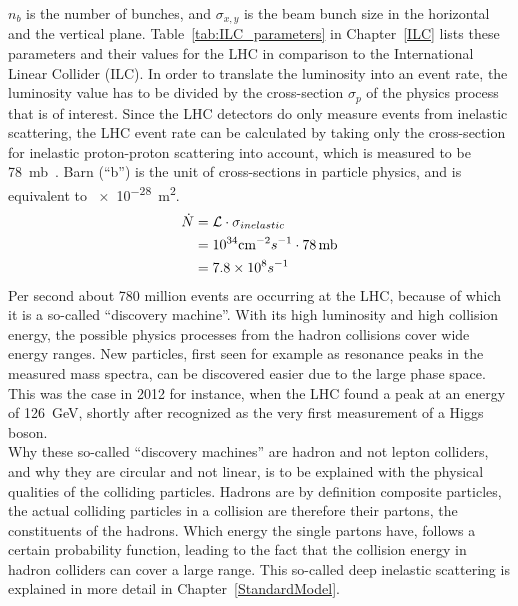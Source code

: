 $n_{b}$ is the number of bunches, and $\sigma_{x,y}$ is the beam bunch size in the horizontal and the vertical plane.
Table~\ref{tab:ILC_parameters} in Chapter~\ref{ILC} lists these parameters and their values for the LHC in comparison to the International Linear Collider (ILC).
In order to translate the luminosity into an event rate, the luminosity value has to be divided by the cross-section $\sigma_p$ of the physics process that is of interest.
Since the LHC detectors do only measure events from inelastic scattering, the LHC event rate can be calculated by taking only the cross-section for inelastic proton-proton scattering into account, which is measured to be \SI{78}{\milli\barn}~\cite{inelXSection}. Barn (``b'') is the unit of cross-sections in particle physics, and is equivalent to \SI{e-28}{\meter\squared}.
\begin{align}
 \dot{N}&=\mathcal{L}\cdot\sigma_{inelastic}\\
 &=10^{34} \textrm{cm}^{-2}s^{-1} \cdot 78\textrm{\,mb}\\
 &=7.8\times 10^8 s^{-1}
\end{align}
Per second about 780 million events are occurring at the LHC, because of which it is a so-called ``discovery machine''.
With its high luminosity and high collision energy, the possible physics processes from the hadron collisions cover wide energy ranges.  
New particles, first seen for example as resonance peaks in the measured mass spectra, can be discovered easier due to the large phase space.
This was the case in 2012 for instance, when the LHC found a peak at an energy of \SI{126}{\GeV}, shortly after recognized as the very first measurement of a Higgs boson.~\cite{Higgs}\\
Why these so-called ``discovery machines'' are hadron and not lepton colliders, and why they are circular and not linear, is to be explained with the physical qualities of the colliding particles.
Hadrons are by definition composite particles, the actual colliding particles in a collision are therefore their partons, the constituents of the hadrons.
Which energy the single partons have, follows a certain probability function, leading to the fact that the collision energy in hadron colliders can cover a large range.
This so-called deep inelastic scattering is explained in more detail in Chapter~\ref{StandardModel}.\\
